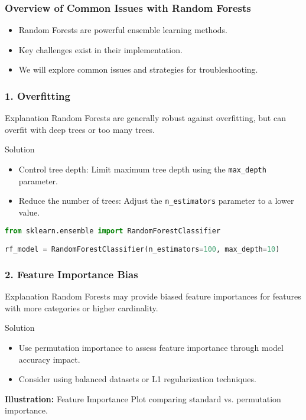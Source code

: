 \documentclass[aspectratio=169]{beamer}
\begin{document}
\begin{frame}
    \titlepage
\end{frame}

\begin{frame}
    \frametitle{Overview of Common Issues with Random Forests}
    \begin{itemize}
        \item Random Forests are powerful ensemble learning methods.
        \item Key challenges exist in their implementation.
        \item We will explore common issues and strategies for troubleshooting.
    \end{itemize}
\end{frame}

\begin{frame}
    \frametitle{1. Overfitting}
    \begin{block}{Explanation}
        Random Forests are generally robust against overfitting, but can overfit with deep trees or too many trees.
    \end{block}
    \begin{block}{Solution}
        \begin{itemize}
            \item Control tree depth: Limit maximum tree depth using the \texttt{max\_depth} parameter.
            \item Reduce the number of trees: Adjust the \texttt{n\_estimators} parameter to a lower value.
        \end{itemize}
    \end{block}
    \begin{lstlisting}[language=Python]
from sklearn.ensemble import RandomForestClassifier

rf_model = RandomForestClassifier(n_estimators=100, max_depth=10)
    \end{lstlisting}
\end{frame}

\begin{frame}
    \frametitle{2. Feature Importance Bias}
    \begin{block}{Explanation}
        Random Forests may provide biased feature importances for features with more categories or higher cardinality.
    \end{block}
    \begin{block}{Solution}
        \begin{itemize}
            \item Use permutation importance to assess feature importance through model accuracy impact.
            \item Consider using balanced datasets or L1 regularization techniques.
        \end{itemize}
    \end{block}
    \textbf{Illustration:} Feature Importance Plot comparing standard vs. permutation importance.
\end{frame}
\end{document}
